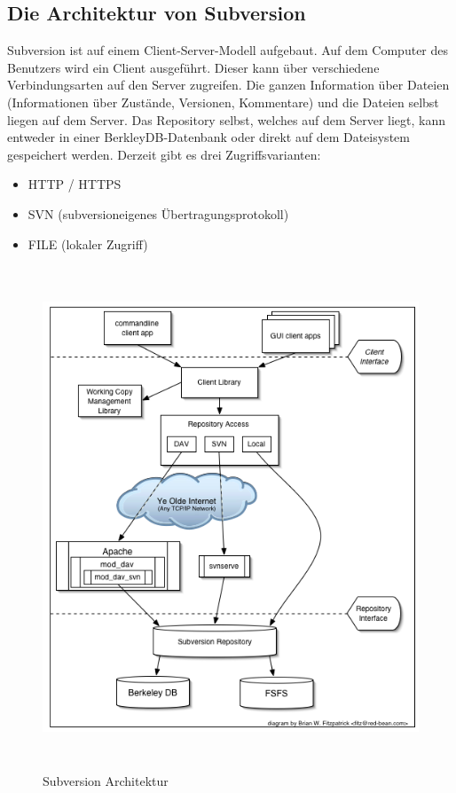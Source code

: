 \subsection{Die Architektur von Subversion}
Subversion ist auf einem Client-Server-Modell aufgebaut. Auf dem Computer des Benutzers wird ein Client ausgef\"uhrt. Dieser kann \"uber verschiedene Verbindungsarten auf den Server zugreifen. Die ganzen Information \"uber Dateien (Informationen \"uber Zust\"ande, Versionen, Kommentare) und die Dateien selbst liegen auf dem Server. Das Repository selbst, welches auf dem Server liegt, kann entweder in einer BerkleyDB-Datenbank oder direkt auf dem Dateisystem gespeichert werden. Derzeit gibt es drei Zugriffsvarianten:
\begin{itemize}
    \item HTTP / HTTPS
    \item SVN (subversioneigenes \"Ubertragungsprotokoll)
    \item FILE (lokaler Zugriff)
\end{itemize}
\newpage
\begin{figure}[!htbp]
\centering
\includegraphics[height=15cm]{subversion_architektur.png}
\caption{Subversion Architektur}
\label{fig:logo}
\end{figure}

